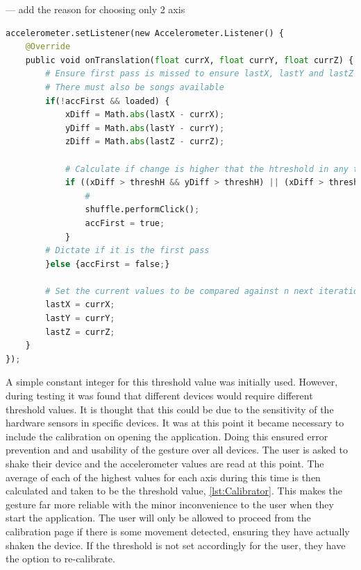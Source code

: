 \documentclass{l4proj}
\begin{document}
--- add the reason for choosing only 2 axis

\begin{lstlisting}[language=python, float, caption={Java code detailing how the Shake Gesture is detected and how it is acted upon.}, label=lst:Accelerometer]
accelerometer.setListener(new Accelerometer.Listener() {
    @Override
    public void onTranslation(float currX, float currY, float currZ) {
        # Ensure first pass is missed to ensure lastX, lastY and lastZ have values
        # There must also be songs available 
        if(!accFirst && loaded) {
            xDiff = Math.abs(lastX - currX);
            yDiff = Math.abs(lastY - currY);
            zDiff = Math.abs(lastZ - currZ);

            # Calculate if change is higher that the htreshold in any two axis
            if ((xDiff > threshH && yDiff > threshH) || (xDiff > threshH && zDiff > threshH) || (yDiff > threshH && zDiff > threshH)){
                # 
                shuffle.performClick();
                accFirst = true;
            }
        # Dictate if it is the first pass
        }else {accFirst = false;}

        # Set the current values to be compared against n next iteration
        lastX = currX;
        lastY = currY;
        lastZ = currZ;
    }        
});
\end{lstlisting}

A simple constant integer for this threshold value was initially used. However, during testing it was found that different devices would require different threshold values. It is thought that this could be due to the sensitivity of the hardware sensors in specific devices. It was at this point it became necessary to include the calibration on opening the application. Doing this ensured error prevention and and usability of the gesture over all devices. The user is asked to shake their device and the accelerometer values are read at this point. The average of each of the highest values for each axis during this time is then calculated and taken to be the threshold value, \ref{lst:Calibrator}. This makes the gesture far more reliable with the minor inconvenience to the user when they start the application. The user will only be allowed to proceed from the calibration page if there is some movement detected, ensuring they have actually shaken the device. If the threshold is not set accordingly for the user, they have the option to re-calibrate.
\end{document}
